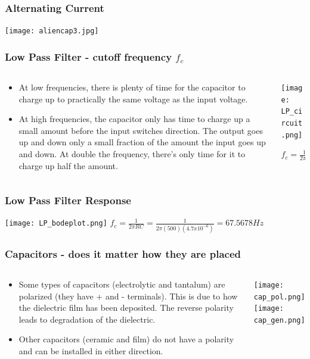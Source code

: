 \documentclass{beamer}
\begin{document}
\begin{frame}\frametitle{Alternating Current}
\begin{center}
\texttt{[image: aliencap3.jpg]}
\end{center}
\end{frame}

\begin{frame} \frametitle{Low Pass Filter - cutoff frequency $f_{c}$}
\begin{columns}
\begin{column}{7cm}
\begin{itemize}
\item At low frequencies, there is plenty of time for the capacitor to charge up to practically the same voltage as the input voltage.
\item At high frequencies, the capacitor only has time to charge up a small amount before the input switches direction. The output goes up and down only a small fraction of the amount the input goes up and down. At double the frequency, there's only time for it to charge up half the amount.
\end{itemize}
\end{column}
\begin{column}{4cm}
\begin{overprint}
\texttt{[image: LP\_circuit.png]}
\end{overprint}
$ f_{c} = \frac{1}{2 \pi \tau} = \frac{1}{2 \pi RC} $
\end{column}
\end{columns}
\end{frame}

\begin{frame}\frametitle{Low Pass Filter Response}
\begin{center}
	\texttt{[image: LP\_bodeplot.png]}
$ f_{c} = \frac{1}{2 \pi RC} = \frac{1}{2 \pi (500) (4.7 x 10^{-6})} = 67.5678 Hz $
\end{center}
\end{frame}


\begin{frame} \frametitle{Capacitors - does it matter how they are placed}
\begin{columns}
\begin{column}{6cm}
\begin{itemize}
\item Some types of capacitors (electrolytic and tantalum) are polarized (they have + and - terminals). This is due to how the dielectric film has been deposited. The reverse polarity leads to degradation of the dielectric.
\item Other capacitors (ceramic and film)  do not have a polarity and can be installed in either direction. 
\end{itemize}
\end{column}
\begin{column}{4cm}
\texttt{[image: cap\_pol.png]}
\texttt{[image: cap\_gen.png]}
\end{column}
\end{columns}
\end{frame}
\end{document}
